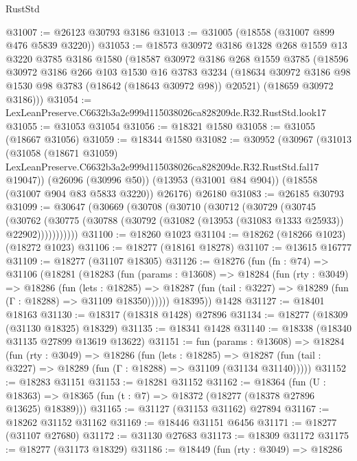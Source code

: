 \begin{lexlean}{RustStd}
\begin{coremodule}
@31007 := @26123 @30793 @3186
@31013 := @31005 (@18558 (@31007 @899 @476 @5839 @3220))
@31053 := @18573
    @30972
    @3186
    @1328
    @268
    @1559
    @13
    @3220
    @3785
    @3186
    @1580
    (@18587
      @30972
      @3186
      @268
      @1559
      @3785
      (@18596
        @30972
        @3186
        @266
        @103
        @1530
        @16
        @3783
        @3234
        (@18634 @30972 @3186 @98 @1530 @98 @3783 (@18642 (@18643 @30972 @98)) @20521)
        (@18659 @30972 @3186)))
@31054 := LexLeanPreserve.C6632b3a2e999d115038026ca828209de.R32.RustStd.look17
@31055 := @31053 @31054
@31056 := @18321 @1580
@31058 := @31055 (@18667 @31056)
@31059 := @18344 @1580
@31082 := @30952
    (@30967
      (@31013
        (@31058
          (@18671 @31059)
          LexLeanPreserve.C6632b3a2e999d115038026ca828209de.R32.RustStd.fal17
          @19047))
      (@26096 (@30996 @50))
      (@13953 (@31001 @84 @904))
      (@18558 (@31007 @904 @83 @5833 @3220))
      @26176)
    @26180
@31083 := @26185 @30793
@31099 := @30647
    (@30669
      (@30708
        (@30710
          (@30712
            (@30729
              (@30745
                (@30762
                  (@30775 (@30788 (@30792 (@31082 (@13953 (@31083 @1333 @25933)) @22902)))))))))))
@31100 := @18260 @1023
@31104 := @18262 (@18266 @1023) (@18272 @1023)
@31106 := @18277 (@18161 @18278)
@31107 := @13615 @16777
@31109 := @18277 (@31107 @18305)
@31126 := @18276
    (fun (fn : @74) =>
    @31106
      (@18281
        (@18283
          (fun (params : @13608) =>
          @18284
            (fun (rty : @3049) =>
            @18286
              (fun (lets : @18285) =>
              @18287 (fun (tail : @3227) => @18289 (fun (Γ : @18288) => @31109 @18350))))))
        @18395))
    @1428
@31127 := @18401 @18163
@31130 := @18317 (@18318 @1428) @27896
@31134 := @18277 (@18309 (@31130 @18325) @18329)
@31135 := @18341 @1428
@31140 := @18338 (@18340 @31135 @27899 @13619 @13622)
@31151 := fun (params : @13608) =>
  @18284
    (fun (rty : @3049) =>
    @18286
      (fun (lets : @18285) =>
      @18287 (fun (tail : @3227) => @18289 (fun (Γ : @18288) => @31109 (@31134 @31140)))))
@31152 := @18283 @31151
@31153 := @18281 @31152
@31162 := @18364
    (fun (U : @18363) => @18365 (fun (t : @7) => @18372 (@18277 (@18378 @27896 @13625) @18389)))
@31165 := @31127 (@31153 @31162) @27894
@31167 := @18262 @31152 @31162
@31169 := @18446 @31151 @6456
@31171 := @18277 (@31107 @27680)
@31172 := @31130 @27683
@31173 := @18309 @31172
@31175 := @18277 (@31173 @18329)
@31186 := @18449
    (fun (rty : @3049) =>
    @18286

\end{coremodule}
\end{lexlean}
